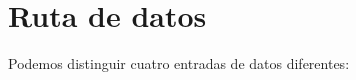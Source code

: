 \documentclass[11pt, a4paper, spanish, openright, twoside]{book}
\begin{document}
\newpage
\mbox{}
\thispagestyle{empty}						%
\newpage


\tableofcontents 							%

\newpage
\mbox{}
\thispagestyle{empty}						%
\newpage


\vspace{3cm}


\section{Ruta de datos}
	Podemos distinguir cuatro entradas de datos diferentes:
\end{document}

